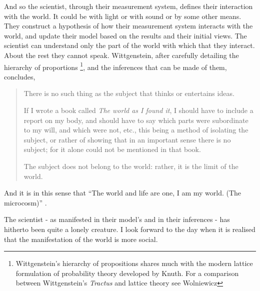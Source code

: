 And so the scientist, through their measurement system, 
defines their interaction with the world.  
It could be with light or with sound or by some other means.  
They construct a hypothesis of how their measurement system interacts with the world,
and update their model based on the results and their initial views.
The scientist can understand only the part of the world with which that they interact.
About the rest they cannot speak.
Wittgenstein\cite{WittgensteinBook}, after  carefully detailing the hierarchy of proportions%
\footnote{
Wittgenstein's hierarchy of propositions shares much with the modern lattice 
formulation of probability theory developed by Knuth\cite{Knuth2005a, Knuth2012}.
For a  comparison between Wittgenstein's {\em Tractus} and lattice theory see Wolniewicz\cite{WolniewiczBook} 
}, and the inferences that can be made of them,
concludes,
\begin{quote}
 There is no such thing as the subject that thinks or entertains
 ideas.

 If I wrote a book called {\em The world as I found it},
 I should have to include a report on my body, and should have to say
 which parts were subordinate to my will,
 and which were not, etc., this being a method of isolating the subject,
 or rather of showing that in an important sense there is no subject;
 for it alone could not be mentioned in that book.

 The subject does not belong to the world: rather, it is the limit of
 the world. 
\end{quote}
And it is in this sense that
 ``The world and life are one, I am my world. (The microcosm)'' \cite{WittgensteinBook}.

The scientist - as manifested in their model's and in their inferences - has hitherto been quite a lonely creature.
I look forward to the day when it is realised that the manifestation of the world is more social.  




